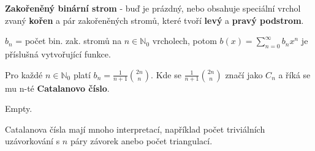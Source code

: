 \textbf{Zakořeněný binární strom} - buď je prázdný, nebo obsahuje speciální vrchol zvaný \textbf{kořen} a pár zakořeněných stromů, které tvoří \textbf{levý} a \textbf{pravý podstrom}.

$b_{n}$ = počet bin. zak. stromů na $n \in \mathbb{N}_{0}$ vrcholech, potom $b(x) = \sum_{n = 0}^{\infty}b_{n} x^{n}$ je příslušná vytvořující funkce.

\begin{veta}
	Pro každé $n \in \mathbb{N}_{0}$ platí $b_{n}=\frac{1}{n+1}\binom{2n}{n}$. Kde se $\frac{1}{n+1}\binom{2n}{n}$ značí jako $C_n$ a říká se mu n-té \textbf{Catalanovo číslo}.
\end{veta}

\begin{dukaz}
	Empty.
\end{dukaz}

Catalanova čísla mají mnoho interpretací, například počet triviálních uzávorkování s $n$ páry závorek anebo počet triangulací.